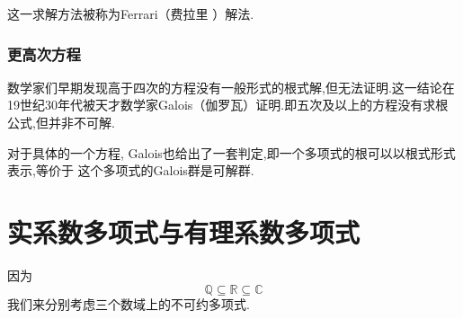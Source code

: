 这一求解方法被称为\textup{Ferrari}（费拉里
）解法.
\subsubsection{更高次方程}
数学家们早期发现高于四次的方程没有一般形式的根式解,但无法证明.这一结论在
19世纪30年代被天才数学家\textup{Galois}（伽罗瓦）证明.即五次及以上的方程没有求根公式,但并非不可解.

对于具体的一个方程,
Galois也给出了一套判定,即一个多项式的根可以以根式形式表示,等价于
这个多项式的Galois群是可解群.
\newpage
\section{实系数多项式与有理系数多项式}
\begin{red}
    \begin{remark}
因为\[
\mathbb{Q}\subseteq \mathbb{R}\subseteq\mathbb{C}
\]
我们来分别考虑三个数域上的不可约多项式.
    \end{remark}
\end{red}
